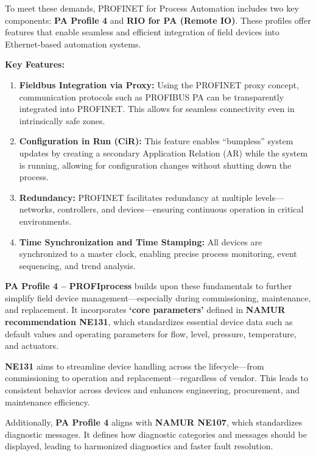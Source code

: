\documentclass[conference]{IEEEtran}
\begin{document}
To meet these demands, PROFINET for Process Automation includes two key components: \textbf{PA Profile 4} and \textbf{RIO for PA (Remote IO)}. These profiles offer features that enable seamless and efficient integration of field devices into Ethernet-based automation systems.

\textbf{Key Features:}
\begin{enumerate}
    \item \textbf{Fieldbus Integration via Proxy:} 
    Using the PROFINET proxy concept, communication protocols such as PROFIBUS PA can be transparently integrated into PROFINET. This allows for seamless connectivity even in intrinsically safe zones.

    \item \textbf{Configuration in Run (CiR):} 
    This feature enables “bumpless” system updates by creating a secondary Application Relation (AR) while the system is running, allowing for configuration changes without shutting down the process.

    \item \textbf{Redundancy:}
    PROFINET facilitates redundancy at multiple levels—networks, controllers, and devices—ensuring continuous operation in critical environments.

    \item \textbf{Time Synchronization and Time Stamping:}
    All devices are synchronized to a master clock, enabling precise process monitoring, event sequencing, and trend analysis.
\end{enumerate}

\textbf{PA Profile 4 – PROFIprocess} builds upon these fundamentals to further simplify field device management—especially during commissioning, maintenance, and replacement. It incorporates \textbf{‘core parameters’} defined in \textbf{NAMUR recommendation NE131}, which standardizes essential device data such as default values and operating parameters for flow, level, pressure, temperature, and actuators.

\textbf{NE131} aims to streamline device handling across the lifecycle—from commissioning to operation and replacement—regardless of vendor. This leads to consistent behavior across devices and enhances engineering, procurement, and maintenance efficiency.

Additionally, \textbf{PA Profile 4} aligns with \textbf{NAMUR NE107}, which standardizes diagnostic messages. It defines how diagnostic categories and messages should be displayed, leading to harmonized diagnostics and faster fault resolution.
\end{document}
